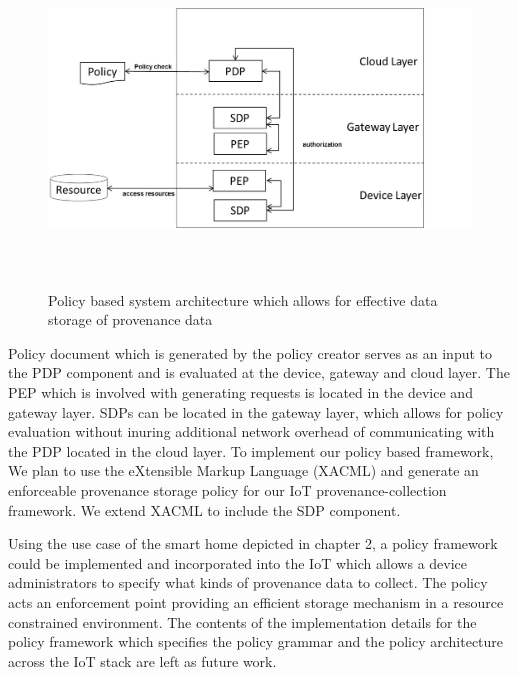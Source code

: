 \begin{figure}[h!]
\begin{center}
\includegraphics[height=3.5in]{policy.png}
\caption{Policy based system architecture which allows for effective data storage of provenance data}
\label{policy_architecture}
\end{center}
\end{figure}


Policy document which is generated by the policy creator serves as an input to the PDP component and is evaluated at the device, gateway and cloud layer. The PEP which is involved with generating requests is located in the device and gateway layer. SDPs can be located in the gateway layer, which allows for policy evaluation without inuring additional network overhead of communicating with the PDP located in the cloud layer. To implement our policy based framework, We plan to use the eXtensible Markup Language (XACML)  \cite{xacml} and generate an enforceable provenance storage policy for our IoT provenance-collection framework. We extend XACML to include the SDP component.



\par Using the use case of the smart home depicted in chapter 2, a policy framework could be implemented and incorporated into the IoT which allows a device administrators to specify what kinds of provenance data to collect. The policy acts an enforcement point providing an efficient storage mechanism in a resource constrained environment. The contents of the implementation details for the policy framework which specifies the policy grammar and the policy architecture across the IoT stack are left as future work.


